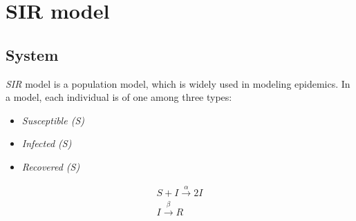 \section{SIR model}
\subsection{System}
\textit{SIR} model  is a population model, which is widely used in
modeling epidemics. In a  model, each individual is of one
among three types:
\begin{itemize}
    \item \textit{Susceptible (S)}
    \item \textit{Infected (S)}
    \item \textit{Recovered (S)}
\end{itemize}
\begin{align*}
    S + I \xrightarrow{\alpha} 2I \\
    I \xrightarrow{\beta} R
\end{align*}

